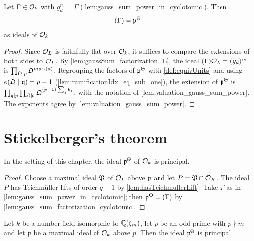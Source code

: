 \begin{lemma}
  \label{lem:gauss_sum_factorization_cyclotomic}
  \leanok
  Let $\Gamma \in \mathcal{O}_k$ with $g_d^m = \Gamma$ (\ref{lem:gauss_sum_power_in_cyclotomic}). Then
  \[
    (\Gamma) = \mathfrak{p}^{\Theta}
  \]
  as ideals of $\mathcal{O}_k$.
\end{lemma}

\begin{proof}
  \leanok
  Since $\mathcal{O}_L$ is faithfully flat over $\mathcal{O}_k$, it suffices to compare the extensions of both
  sides to $\mathcal{O}_L$. By \ref{lem:gaussSum_factorization_L}, the ideal $(\Gamma)\mathcal{O}_L = (g_d)^m$
  is $\prod_{\mathfrak{Q} \mid p} \mathfrak{Q}^{m s_{\mathfrak{Q}}(d)}$. Regrouping the factors of $\mathfrak{p}^{\Theta}$ with
  \ref{def:equivUnits} and using $e(\mathfrak{Q} \mid \mathfrak{q}) = p - 1$
  (\ref{lem:ramificationIdx_eq_sub_one}), the extension of $\mathfrak{p}^{\Theta}$ is
  $\prod_{\mathfrak{q} \mid p} \prod_{\mathfrak{Q} \mid \mathfrak{q}} \mathfrak{Q}^{(p-1) \sum_j b_j}$, with the notation of
  \ref{lem:valuation_gauss_sum_power}. The exponents agree by
  \ref{lem:valuation_gauss_sum_power}.
\end{proof}

\section{Stickelberger's theorem}

\begin{lemma}
  \label{lem:stickelberger_in_L}
  \leanok
  In the setting of this chapter, the ideal $\mathfrak{p}^{\Theta}$ of $\mathcal{O}_k$ is principal.
\end{lemma}

\begin{proof}
  \leanok
  Choose a maximal ideal $\mathfrak{P}$ of $\mathcal{O}_L$ above $\mathfrak{p}$ and let $P = \mathfrak{P} \cap \mathcal{O}_K$. The ideal
  $P$ has Teichmüller lifts of order $q - 1$ by \ref{lem:hasTeichmullerLift}. Take $\Gamma$ as in
  \ref{lem:gauss_sum_power_in_cyclotomic}; then $\mathfrak{p}^{\Theta} = (\Gamma)$ by
  \ref{lem:gauss_sum_factorization_cyclotomic}.
\end{proof}

\begin{theorem}
  \label{thm:stickelberger}
  \leanok
  Let $k$ be a number field isomorphic to $\mathbb{Q}(\zeta_m)$, let $p$ be an odd prime with
  $p \nmid m$ and let $\mathfrak{p}$ be a maximal ideal of $\mathcal{O}_k$ above $p$. Then the ideal
  $\mathfrak{p}^{\Theta}$ is principal.
\end{theorem}

